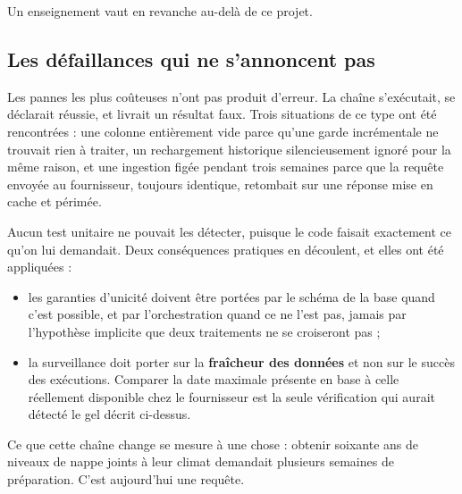 Un enseignement vaut en revanche au-delà de ce projet.

\subsection{Les défaillances qui ne s'annoncent pas}

Les pannes les plus coûteuses n'ont pas produit d'erreur. La chaîne s'exécutait, se déclarait
réussie, et livrait un résultat faux. Trois situations de ce type ont été rencontrées : une
colonne entièrement vide parce qu'une garde incrémentale ne trouvait rien à traiter, un
rechargement historique silencieusement ignoré pour la même raison, et une ingestion figée
pendant trois semaines parce que la requête envoyée au fournisseur, toujours identique,
retombait sur une réponse mise en cache et périmée.

Aucun test unitaire ne pouvait les détecter, puisque le code faisait exactement ce qu'on lui
demandait. Deux conséquences pratiques en découlent, et elles ont été appliquées :

\begin{itemize}
  \item les garanties d'unicité doivent être portées par le schéma de la base quand c'est
  possible, et par l'orchestration quand ce ne l'est pas, jamais par l'hypothèse implicite que
  deux traitements ne se croiseront pas ;
  \item la surveillance doit porter sur la \textbf{fraîcheur des données} et non sur le succès
  des exécutions. Comparer la date maximale présente en base à celle réellement disponible chez
  le fournisseur est la seule vérification qui aurait détecté le gel décrit ci-dessus.
\end{itemize}

Ce que cette chaîne change se mesure à une chose : obtenir soixante ans de niveaux de nappe
joints à leur climat demandait plusieurs semaines de préparation. C'est aujourd'hui une requête.
